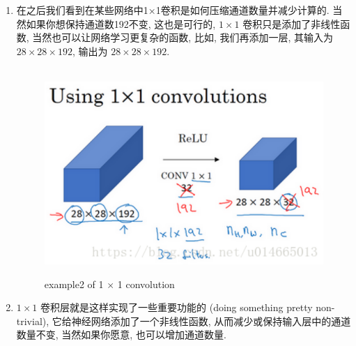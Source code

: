 \documentclass[12pt]{ctexart}%
\begin{document}
\begin{enumerate}
				\item 在之后我们看到在某些网络中1×1卷积是如何压缩通道数量并减少计算的. 当然如果你想保持通道数192不变, 这也是可行的, $1 \times 1$ 卷积只是添加了非线性函数, 当然也可以让网络学习更复杂的函数, 比如, 我们再添加一层, 其输入为 $28\times 28\times 192$, 输出为 $28\times 28\times 192$.
						\begin{figure}[H]
							\vspace{-0.2cm}  %
							\setlength{\abovecaptionskip}{-0.2cm}   %
							\centering
							\includegraphics[scale=0.5]{example2_network_in_network.png}
							\renewcommand{\figurename}{Fig} %
							\caption{example2 of 1 $\times$ 1 convolution}
							\label{fig15: example2 network in network}
						\end{figure}
					
				\item $1\times 1$ 卷积层就是这样实现了一些重要功能的 (doing something pretty non-trivial), 它给神经网络添加了一个非线性函数, 从而减少或保持输入层中的通道数量不变, 当然如果你愿意, 也可以增加通道数量.
			\end{enumerate}
\end{document}
